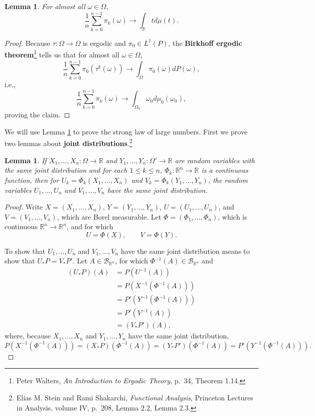 \documentclass{article}
\newtheorem{lemma}[theorem]{Lemma}
\theoremstyle{definition}
\begin{document}
\begin{lemma}
For almost all $\omega \in \Omega$,
\[
\frac{1}{n} \sum_{k=0}^{n-1} \pi_k(\omega) \to \int_{\mathbb{R}} t d\mu(t).
\]
\label{pi0}
\end{lemma}
\begin{proof}
Because 
 $\tau:\Omega \to \Omega$ is ergodic and
$\pi_0 \in L^1(P)$,
the \textbf{Birkhoff ergodic theorem}\footnote{Peter Walters,
{\em An Introduction to Ergodic Theory}, p.~34, Theorem 1.14.}
tells us that
for almost all $\omega \in \Omega$,
\[
\frac{1}{n} \sum_{k=0}^{n-1} \pi_0(\tau^k(\omega)) \to \int_\Omega \pi_0(\omega) dP(\omega),
\]
i.e.,
\[
\frac{1}{n} \sum_{k=0}^{n-1} \pi_k(\omega) \to \int_{\Omega_0} \omega_0 d\mu_0(\omega_0),
\]
proving the claim.
\end{proof}


We will use Lemma \ref{pi0} to prove the strong law of large numbers. First
we prove two lemmas about \textbf{joint distributions}.\footnote{Elias M. Stein and Rami Shakarchi,
{\em Functional Analysis}, Princeton Lectures in Analysis, volume IV, p.~208, Lemma 2.2, Lemma 2.3.}

\begin{lemma}
If $X_1,\ldots,X_n:\Omega \to \mathbb{R}$ and $Y_1,\ldots,Y_n:\Omega' \to \mathbb{R}$ are random variables
with the same joint distribution and for each $1 \leq k \leq n$,
 $\Phi_k:\mathbb{R}^n \to \mathbb{R}$ is a continuous function,
then
for $U_k=\Phi_k(X_1,\ldots,X_n)$ and
$V_k=\Phi_k(Y_1,\ldots,Y_n)$,
the random variables
$U_1,\ldots,U_n$ and $V_1,\ldots,V_n$ 
have the same joint distribution. 
\label{joint}
\end{lemma}
\begin{proof}
Write 
$X=(X_1,\ldots,X_n)$, $Y=(Y_1,\ldots,Y_n)$,
$U=(U_1,\ldots,U_n)$, and $V=(V_1,\ldots,V_n)$, which are Borel measurable.
Let $\Phi=(\Phi_1,\ldots,\Phi_n)$, which is continuous $\mathbb{R}^n \to \mathbb{R}^n$,
and for which
\[
U = \Phi(X), \qquad V = \Phi(Y).
\]

To show that $U_1,\ldots,U_n$ and $V_1,\ldots,V_n$ have the same joint distribution
means to show that $U_*P=V_*P'$. Let
$A \in \mathscr{B}_{\mathbb{R}^n}$, for which
$\Phi^{-1}(A) \in \mathscr{B}_{\mathbb{R}^n}$ and
\begin{align*}
(U_*P)(A)&=P(U^{-1}(A))\\
&=P(X^{-1}(\Phi^{-1}(A)))\\
&=P'(Y^{-1}(\Phi^{-1}(A)))\\
&=P'(V^{-1}(A))\\
&=(V_* P')(A),
\end{align*}
where, because $X_1,\ldots,X_n$ and $Y_1,\ldots,Y_n$ have the same joint distribution,
\[
P(X^{-1}(\Phi^{-1}(A)))=(X_*P)(\Phi^{-1}(A))
=(Y_*P')(\Phi^{-1}(A))
=P'(Y^{-1}(\Phi^{-1}(A))).
\]
\end{proof}
\end{document}
